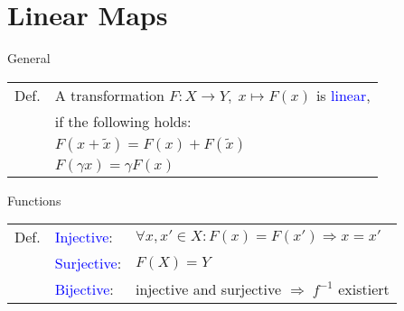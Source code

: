 \section{Linear Maps}
\begin{mainbox}{General}
	\setlength{\tabcolsep}{2pt}
	\begin{tabular}{rl}
		Def. & A transformation $F: X \rightarrow Y,\; x\mapsto F(x)$ is \textcolor{blue}{linear},\\
		& if the following holds:\\
		& $F(x+\tilde{x}) = F(x) + F(\tilde{x})$\\
		& $F(\gamma x) = \gamma F(x)$\\
	\end{tabular}
\end{mainbox}

\begin{mainbox}{Functions}
	\setlength{\tabcolsep}{2pt}
	\begin{tabular}{rll}
		Def. & \textcolor{blue}{Injective}: & $\forall x, x' \in X: F(x) = F(x') \Rightarrow x = x'$ \\
		& \textcolor{blue}{Surjective}: & $F(X) = Y$ \\
		& \textcolor{blue}{Bijective}: & injective and surjective $\Rightarrow\;f^{-1}$ existiert \\
	\end{tabular}
\end{mainbox}

